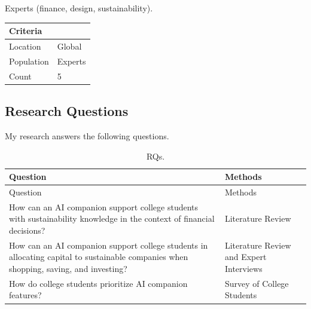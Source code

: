\documentclass[
  letterpaper,
  DIV=11,
  numbers=noendperiod]{scrartcl}
\begin{document}
Experts (finance, design, sustainability).

\begin{longtable}[]{@{}ll@{}}
\toprule\noalign{}
Criteria & \\
\midrule\noalign{}
\endhead
\bottomrule\noalign{}
\endlastfoot
Location & Global \\
Population & Experts \\
Count & 5 \\
\end{longtable}

\subsection{Research Questions}\label{research-questions}

My research answers the following questions.

\begin{longtable}[]{@{}
  >{\raggedright\arraybackslash}p{}
  >{\raggedright\arraybackslash}p{}@{}}
\caption{RQs.}\tabularnewline
\toprule\noalign{}
\begin{minipage}[b]{\linewidth}\raggedright
Question
\end{minipage} & \begin{minipage}[b]{\linewidth}\raggedright
Methods
\end{minipage} \\
\midrule\noalign{}
\endfirsthead
\toprule\noalign{}
\begin{minipage}[b]{\linewidth}\raggedright
Question
\end{minipage} & \begin{minipage}[b]{\linewidth}\raggedright
Methods
\end{minipage} \\
\midrule\noalign{}
\endhead
\bottomrule\noalign{}
\endlastfoot
How can an AI companion support college students with sustainability
knowledge in the context of financial decisions? & Literature Review \\
How can an AI companion support college students in allocating capital
to sustainable companies when shopping, saving, and investing? &
Literature Review and Expert Interviews \\
How do college students prioritize AI companion features? & Survey of
College Students \\
\end{longtable}
\end{document}
